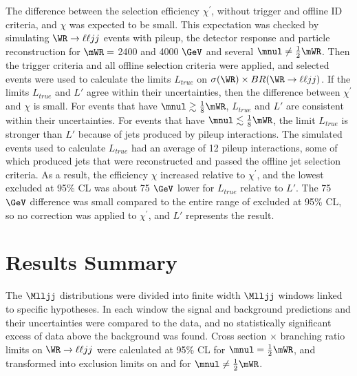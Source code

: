The difference between the selection efficiency $\chi^'$, without trigger and offline ID criteria, and $\chi$ was expected to be small.  
This expectation was checked by simulating $\WR \rightarrow \ell\ell jj$ events with pileup, the detector response and particle 
reconstruction for $\mWR =$ 2400 and 4000 $\GeV$ and several $\mnul \neq \frac{1}{2}\mWR$.  Then the trigger criteria and all offline selection 
criteria were applied, and selected events were used to calculate the limits $L_{true}$ on $\sigma(\WR) \times BR(\WR \rightarrow \ell\ell jj)$.  
If the limits $L_{true}$ and $L'$ agree within their uncertainties, then the difference between $\chi^'$ and $\chi$ is small.  For events that 
have $\mnul \gtrsim \frac{1}{8}\mWR$, $L_{true}$ and $L'$ are consistent within their uncertainties.  For events that have 
$\mnul \lesssim \frac{1}{8}\mWR$, the limit $L_{true}$ is stronger than $L'$ because of jets produced by pileup interactions.  The simulated 
events used to calculate $L_{true}$ had an average of 12 pileup interactions, some of which produced jets that were reconstructed and passed 
the offline jet selection criteria.  As a result, the efficiency $\chi$ increased relative to $\chi^'$, and the lowest \mnul excluded 
at 95\% CL was about 75 $\GeV$ lower for $L_{true}$ relative to $L'$.  The 75 $\GeV$ difference was small compared to the entire range of 
\mnul excluded at 95\% CL, so no correction was applied to $\chi^'$, and $L'$ represents the result.


\section{Results Summary}
The $\Mlljj$ distributions were divided into finite width $\Mlljj$ windows linked to specific \mWR hypotheses.  In each window the 
signal and background predictions and their uncertainties were compared to the data, and no statistically significant excess of 
data above the background was found.  Cross section $\times$ branching ratio limits on $\WR \rightarrow \ell\ell jj$ were calculated 
at 95\% CL for $\mnul = \frac{1}{2}\mWR$, and transformed into exclusion limits on \mWR and \mnul for $\mnul \neq \frac{1}{2}\mWR$.


